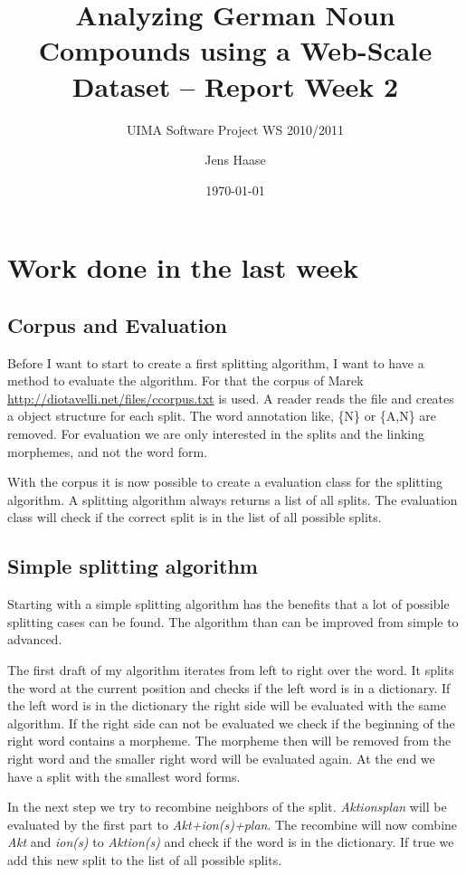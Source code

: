 \documentclass[11pt, accentcolor=tud9b, nochapname]{tudexercise}
\begin{document}
\author{Jens Haase}
\title{Analyzing German Noun Compounds using a
  Web-Scale Dataset -- Report Week 2}
\subtitle{UIMA Software Project WS 2010/2011}
\date{\today}
\maketitle

\section{Work done in the last week}

\subsection{Corpus and Evaluation}
Before I want to start to create a first splitting algorithm, I want to have a method to evaluate the algorithm. For that the corpus of Marek \url{http://diotavelli.net/files/ccorpus.txt} is used. A reader reads the file and creates a object structure for each split. The word annotation like, \{N\} or \{A,N\} are removed. For evaluation we are only interested in the splits and the linking morphemes, and not the word form.

With the corpus it is now possible to create a evaluation class for the splitting algorithm. A splitting algorithm always returns a list of all splits. The evaluation class will check if the correct split is in the list of all possible splits.

\subsection{Simple splitting algorithm}
Starting with a simple splitting algorithm has the benefits that a lot of possible splitting cases can be found. The algorithm than can be improved from simple to advanced.

The first draft of my algorithm iterates from left to right over the word. It splits the word at the current position and checks if the left word is in a dictionary. If the left word is in the dictionary the right side will be evaluated with the same algorithm. If the right side can not be evaluated we check if the beginning of the right word contains a morpheme. The morpheme then will be removed from the right word and the smaller right word will be evaluated again. At the end we have a split with the smallest word forms.

In the next step we try to recombine neighbors of the split. \emph{Aktionsplan} will be evaluated by the first part to \emph{Akt+ion(s)+plan}. The recombine will now combine \emph{Akt} and \emph{ion(s)} to \emph{Aktion(s)} and check if the word is in the dictionary. If true we add this new split to the list of all possible splits.
\end{document}
